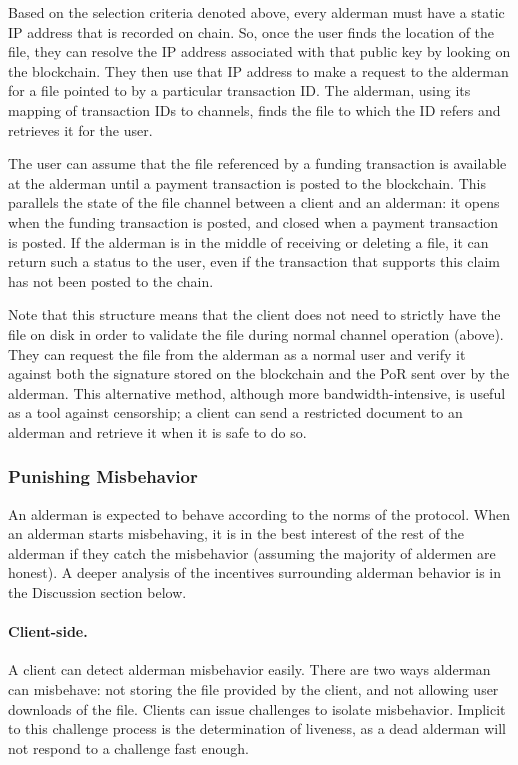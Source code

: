 \documentclass{article}
\begin{document}
Based on the selection criteria denoted above, every alderman must have a static
IP address that is recorded on chain. So, once the user finds the location of
the file, they can resolve the IP address associated with that public key by
looking on the blockchain. They then use that IP address to make a request to
the alderman for a file pointed to by a particular transaction ID. The alderman,
using its mapping of transaction IDs to channels, finds the file to which the ID
refers and retrieves it for the user.

The user can assume that the file referenced by a funding transaction is
available at the alderman until a payment transaction is posted to the
blockchain. This parallels the state of the file channel between a client and an
alderman: it opens when the funding transaction is posted, and closed when a
payment transaction is posted. If the alderman is in the middle of receiving or
deleting a file, it can return such a status to the user, even if the
transaction that supports this claim has not been posted to the chain. 

Note that this structure means that the client does not need to strictly have the
file on disk in order to validate the file during normal channel operation
(above). They can request the file from the alderman as a normal user and verify
it against both the signature stored on the blockchain and the PoR sent over by
the alderman. This alternative method, although more bandwidth-intensive, is
useful as a tool against censorship; a client can send a restricted document to
an alderman and retrieve it when it is safe to do so.


\subsubsection{Punishing Misbehavior}

An alderman is expected to behave according to the norms of the protocol. When
an alderman starts misbehaving, it is in the best interest of the rest of the
alderman if they catch the misbehavior (assuming the majority of aldermen are
honest). A deeper analysis of the incentives surrounding alderman behavior is in
the Discussion section below.

\paragraph{Client-side.} A client can detect alderman misbehavior easily. There
are two ways alderman can misbehave: not storing the file provided by the client,
and not allowing user downloads of the file. Clients can issue challenges to
isolate misbehavior. Implicit to this challenge process is the determination of
liveness, as a dead alderman will not respond to a challenge fast enough.
\end{document}
